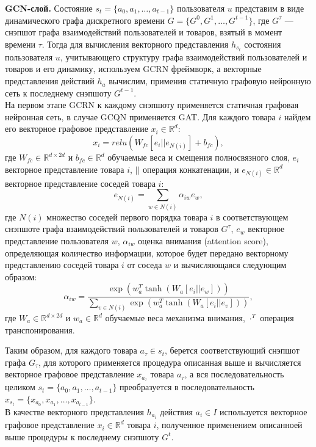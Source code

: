 \documentclass{mipt-thesis-ms}
\begin{document}
{\bf GCN-слой.} Состояние $s_t = \{a_0, a_1, \dots, a_{t-1}\}$ пользователя $u$ представим в виде динамического графа дискретного времени $G = \{G^0, G^1, \dots, G^{t-1}\}$, где $G^{\tau}$ --- снэпшот графа взаимодействий пользователей и товаров, взятый в момент времени $\tau$. Тогда для вычисления векторного представления $h_{s_t}$ состояния пользователя $u$, учитывающего структуру графа взаимодействий пользователей и товаров и его динамику, используем GCRN фреймворк, а векторные представления действий $h_a$ вычислим, применив статичную графовую нейронную сеть к последнему снэпшоту $G^{t-1}$.\\

На первом этапе GCRN к каждому снэпшоту применяется статичная графовая нейронная сеть, в случае GCQN применяется GAT. Для каждого товара $i$ найдем его векторное графовое представление $x_i \in \mathbb{R}^d$:
$$x_i = {relu}(W_{fc}[e_i || e_{N(i)}] + b_{fc}),$$
где $W_{fc} \in \mathbb{R}^{d \times 2d}$ и $b_{fc} \in \mathbb{R}^d$ обучаемые веса и смещения полносвязного слоя, $e_i$ векторное представление товара $i$, $||$ операция конкатенации, и $e_{N(i)} \in \mathbb{R}^d$ векторное представление соседей товара $i$:
$$e_{N(i)} = \sum_{w \in N(i)} \alpha_{iw}e_w,$$
где $N(i)$ множество соседей первого порядка товара $i$ в соответствующем снэпшоте графа взаимодействий пользователей и товаров $G^{\tau}$, $e_w$ векторное представление пользователя $w$, $\alpha_{iw}$ оценка внимания (attention score), определяющая количество информации, которое будет передано векторному представлению соседей товара $i$ от соседа $w$ и вычисляющаяся следующим образом: 
$$\alpha_{iw} = \frac{\exp(w_a^T\tanh(W_a[e_i || e_w]))}{\sum_{v \in N(i)} \exp(w_a^T \tanh(W_a[e_i || e_v]))},$$
где $W_a \in \mathbb{R}^{d \times 2d}$ и $w_a \in \mathbb{R}^d$ обучаемые веса механизма внимания, $\cdot^T$ операция транспонирования.

Таким образом, для каждого товара $a_{\tau} \in s_t$, берется соответствующий снэпшот графа $G_{\tau}$, для которого применяется процедура описанная выше и вычисляется векторное графовое представление $x_{a_{\tau}}$ товара $a_{\tau}$, а вся последовательность целиком $s_t = \{a_0, a_1, \dots, a_{t-1}\}$ преобразуется в последовательность $x_{s_t} = \{x_{a_0}, x_{a_1}, \dots, x_{a_{t-1}}\}$.\\

В качестве векторного представления $h_{a_i}$ действия $a_i \in I$ используется векторное графовое представление $x_i \in \mathbb{R}^d$ товара $i$, полученное применением описанноей выше процедуры к последнему снэпшоту $G^t$.\\
\end{document}
